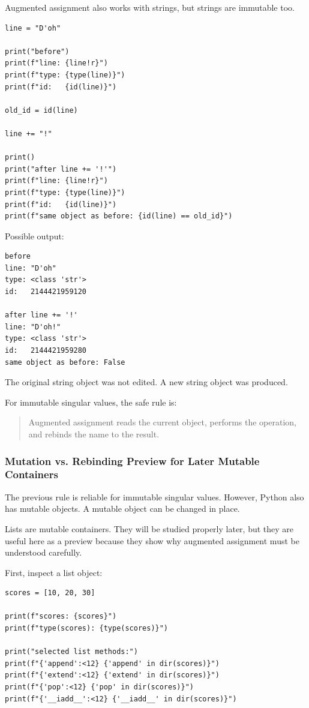 Augmented assignment also works with strings, but strings are immutable too.

\begin{verbatim}
line = "D'oh"

print("before")
print(f"line: {line!r}")
print(f"type: {type(line)}")
print(f"id:   {id(line)}")

old_id = id(line)

line += "!"

print()
print("after line += '!'")
print(f"line: {line!r}")
print(f"type: {type(line)}")
print(f"id:   {id(line)}")
print(f"same object as before: {id(line) == old_id}")
\end{verbatim}

Possible output:

\begin{verbatim}
before
line: "D'oh"
type: <class 'str'>
id:   2144421959120

after line += '!'
line: "D'oh!"
type: <class 'str'>
id:   2144421959280
same object as before: False
\end{verbatim}

The original string object was not edited. A new string object was produced.

For immutable singular values, the safe rule is:

\begin{quote}
Augmented assignment reads the current object, performs the operation, and rebinds the name to the result.
\end{quote}

\subsubsection{Mutation vs. Rebinding Preview for Later Mutable Containers}

The previous rule is reliable for immutable singular values. However, Python also has mutable objects. A mutable object can be changed in place.

Lists are mutable containers. They will be studied properly later, but they are useful here as a preview because they show why augmented assignment must be understood carefully.

First, inspect a list object:

\begin{verbatim}
scores = [10, 20, 30]

print(f"scores: {scores}")
print(f"type(scores): {type(scores)}")

print("selected list methods:")
print(f"{'append':<12} {'append' in dir(scores)}")
print(f"{'extend':<12} {'extend' in dir(scores)}")
print(f"{'pop':<12} {'pop' in dir(scores)}")
print(f"{'__iadd__':<12} {'__iadd__' in dir(scores)}")
\end{verbatim}

